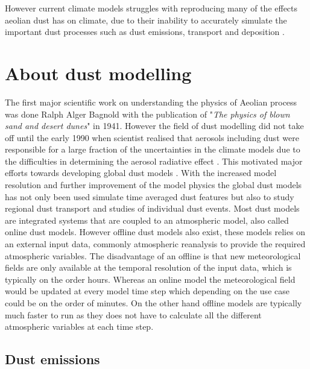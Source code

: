 However current climate models struggles with reproducing many of the effects aeolian dust has on climate, due to their inability to accurately simulate the important dust processes such as dust emissions, transport and deposition \parencite{adebiyi2020dust}. 
\section{About dust modelling}\label{sec:dust_modelling}
The first major scientific work on understanding the physics of Aeolian process was done Ralph Alger Bagnold with the publication of "\emph{The physics of blown sand and desert dunes}" in 1941. However the field of dust modelling did not take off until the early 1990 when scientist realised that aerosols including dust were responsible for a large fraction of the uncertainties in the climate models due to the difficulties in determining the aerosol radiative effect \parencite{tegen1996influence}.
This motivated major efforts towards developing global dust models \parencite{dust_dist_Ginoux2001,zender2003mineral}. With the increased model resolution and further improvement of the model physics the global dust models has not only been used simulate time averaged dust features but also to study regional dust transport \parencite{zhao2006simulated} and studies of individual dust events.
Most dust models are integrated systems  that are coupled to an atmospheric model, also called online dust models. However offline dust models also exist, these models relies on an external input data, commonly atmospheric reanalysis to provide the required atmospheric variables. The disadvantage of an offline is that new meteorological fields are only available at the temporal resolution of the input data, which is typically on the order hours. Whereas an online model the meteorological field would be updated at every model time step which depending on the use case could be on the order of minutes. On the other hand offline models are typically much faster to run as they does not have to calculate all the different atmospheric variables at each time step.           

\subsection{Dust emissions}\label{sec:dust_emission_modelling}

